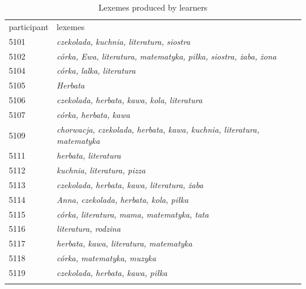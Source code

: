 \begin{table}
    \begin{tabularx}{\textwidth}{ll}
        \lsptoprule
                participant & lexemes\\
        5101 & \textit{czekolada,} \textit{kuchnia,} \textit{literatura,} \textit{siostra}\\
        5102 & \textit{córka,} \textit{Ewa,} \textit{literatura,} \textit{matematyka,} \textit{piłka,} \textit{siostra,} \textit{żaba,} \textit{żona}\\
        5104 & \textit{córka,} \textit{lalka,} \textit{literatura}\\
        5105 & \textit{Herbata}\\
        5106 & \textit{czekolada,} \textit{herbata,} \textit{kawa,} \textit{kola,} \textit{literatura}\\
        5107 & \textit{córka,} \textit{herbata,} \textit{kawa}\\
        5109 & \textit{chorwacja,} \textit{czekolada,} \textit{herbata,} \textit{kawa,} \textit{kuchnia,} \textit{literatura,} \textit{matematyka}\\
        5111 & \textit{herbata,} \textit{literatura}\\
        5112 & \textit{kuchnia,} \textit{literatura,} \textit{pizza} \\
        5113 & \textit{czekolada,} \textit{herbata,} \textit{kawa,} \textit{literatura,} \textit{żaba}\\
        5114 & \textit{Anna,} \textit{czekolada,} \textit{herbata,} \textit{kola,} \textit{piłka}\\
        5115 & \textit{córka,} \textit{literatura,} \textit{mama,} \textit{matematyka,} \textit{tata}\\
        5116 & \textit{literatura,} \textit{rodzina}\\
        5117 & \textit{herbata,} \textit{kawa,} \textit{literatura,} \textit{matematyka}\\
        5118 & \textit{córka,} \textit{matematyka,} \textit{muzyka}\\
        5119 & \textit{czekolada,} \textit{herbata,} \textit{kawa,} \textit{piłka}\\
        \lspbottomrule
    \end{tabularx}
    \caption{Lexemes produced by learners}
    \label{tab:07:4}
\end{table}

